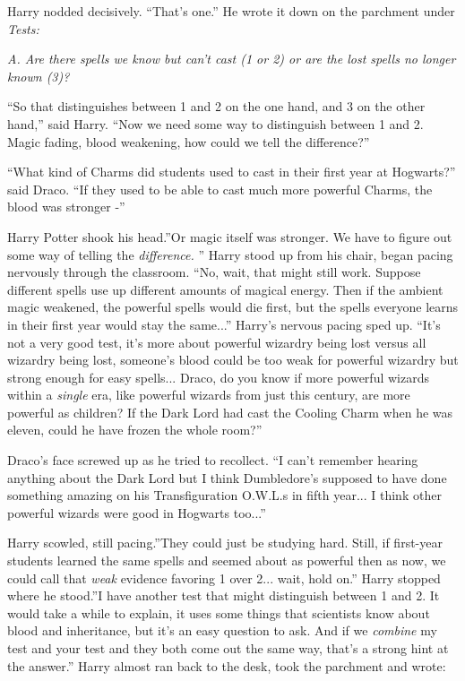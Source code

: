 Harry nodded decisively. ``That's one.'' He wrote it down on the
parchment under \emph{Tests:}

\emph{A. Are there spells we know but can't cast (1 or 2) or are the
lost spells no longer known (3)?}

``So that distinguishes between 1 and 2 on the one hand, and 3 on the
other hand,'' said Harry. ``Now we need some way to distinguish between
1 and 2. Magic fading, blood weakening, how could we tell the
difference?''

``What kind of Charms did students used to cast in their first year at
Hogwarts?'' said Draco. ``If they used to be able to cast much more
powerful Charms, the blood was stronger -''

Harry Potter shook his head.''Or magic itself was stronger. We have to
figure out some way of telling the \emph{difference.} '' Harry stood up
from his chair, began pacing nervously through the classroom. ``No,
wait, that might still work. Suppose different spells use up different
amounts of magical energy. Then if the ambient magic weakened, the
powerful spells would die first, but the spells everyone learns in their
first year would stay the same...'' Harry's nervous pacing sped up.
``It's not a very good test, it's more about powerful wizardry being lost
versus all wizardry being lost, someone's blood could be too weak for
powerful wizardry but strong enough for easy spells... Draco, do
you know if more powerful wizards within a \emph{single} era, like
powerful wizards from just this century, are more powerful as children?
If the Dark Lord had cast the Cooling Charm when he was eleven, could he
have frozen the whole room?''

Draco's face screwed up as he tried to recollect. ``I can't remember
hearing anything about the Dark Lord but I think Dumbledore's supposed
to have done something amazing on his Transfiguration O.W.L.s in fifth
year... I think other powerful wizards were good in Hogwarts
too...''

Harry scowled, still pacing.''They could just be studying hard. Still,
if first-year students learned the same spells and seemed about as
powerful then as now, we could call that \emph{weak} evidence favoring 1
over 2... wait, hold on.'' Harry stopped where he stood.''I have
another test that might distinguish between 1 and 2. It would take a
while to explain, it uses some things that scientists know about blood
and inheritance, but it's an easy question to ask. And if we
\emph{combine} my test and your test and they both come out the same
way, that's a strong hint at the answer.'' Harry almost ran back to the
desk, took the parchment and wrote:

